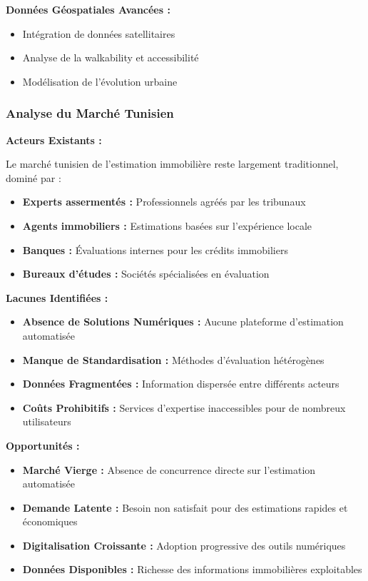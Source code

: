 \textbf{Données Géospatiales Avancées :}
\begin{itemize}
    \item Intégration de données satellitaires
    \item Analyse de la walkability et accessibilité
    \item Modélisation de l'évolution urbaine
\end{itemize}

\subsubsection{Analyse du Marché Tunisien}

\textbf{Acteurs Existants :}

Le marché tunisien de l'estimation immobilière reste largement traditionnel, dominé par :

\begin{itemize}
    \item \textbf{Experts assermentés :} Professionnels agréés par les tribunaux
    \item \textbf{Agents immobiliers :} Estimations basées sur l'expérience locale
    \item \textbf{Banques :} Évaluations internes pour les crédits immobiliers
    \item \textbf{Bureaux d'études :} Sociétés spécialisées en évaluation
\end{itemize}

\textbf{Lacunes Identifiées :}

\begin{itemize}
    \item \textbf{Absence de Solutions Numériques :} Aucune plateforme d'estimation automatisée
    \item \textbf{Manque de Standardisation :} Méthodes d'évaluation hétérogènes
    \item \textbf{Données Fragmentées :} Information dispersée entre différents acteurs
    \item \textbf{Coûts Prohibitifs :} Services d'expertise inaccessibles pour de nombreux utilisateurs
\end{itemize}

\textbf{Opportunités :}

\begin{itemize}
    \item \textbf{Marché Vierge :} Absence de concurrence directe sur l'estimation automatisée
    \item \textbf{Demande Latente :} Besoin non satisfait pour des estimations rapides et économiques
    \item \textbf{Digitalisation Croissante :} Adoption progressive des outils numériques
    \item \textbf{Données Disponibles :} Richesse des informations immobilières exploitables
\end{itemize}

